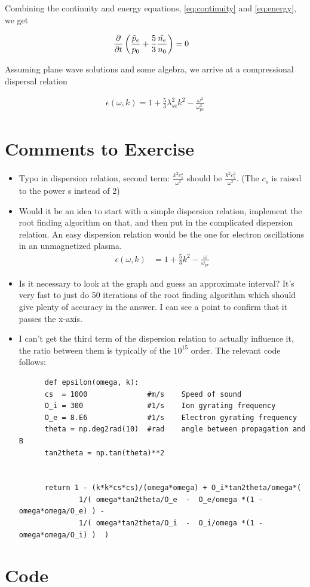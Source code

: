 \documentclass[x11names]{article}
\begin{document}
  Combining the continuity and energy equations, \cref{eq:continuity} and \cref{eq:energy}, we get

  \begin{align}
    \pdv{}{t}\left( \frac{\tilde{p}_e}{p_0} + \frac{5}{3} \frac{\tilde{n_e}}{n_0} \right) &= 0
  \end{align}

  \noindent Assuming plane wave solutions and some algebra, we arrive at a compressional dispersal relation 

  \begin{align}
    \epsilon(\omega, k) = 1 + \frac{5}{3} \lambda_{se}^2k ^2 -  \frac{\omega^2}{\omega_{pe}^2} 
  \end{align}


\section{Comments to Exercise}
  
  \begin{itemize}
    \item Typo in dispersion relation, second term: \(\frac{k^2c_s^s}{\omega^2}\) should be \(\frac{k^2c_s^2}{\omega^2}\). (The \(c_s\) is raised to the power s instead of 2)
    \item Would it be an idea to start with a simple dispersion relation, implement the root finding algorithm on that, and then put in the complicated dispersion relation. An easy dispersion relation would be the one for electron oscillations in an unmagnetized plasma.
    \begin{align}
      \epsilon(\omega, k) &= 1 + \frac{5}{3}k^2 - \frac{\omega}{\omega_{pe}}
    \end{align}
    \item Is it necessary to look at the graph and guess an approximate interval? It's very fast to just do 50 iterations of the root finding algorithm which should give plenty of accuracy in the answer. I can see a point to confirm that it passes the x-axis.
    \item I can't get the third term of the dispersion relation to actually influence it, the ratio between them is typically of the \(10^15\) order. The relevant code follows:
      \begin{lstlisting}
      def epsilon(omega, k):
      cs  = 1000              #m/s    Speed of sound
      O_i = 300               #1/s    Ion gyrating frequency
      O_e = 8.E6              #1/s    Electron gyrating frequency
      theta = np.deg2rad(10)  #rad    angle between propagation and B
      tan2theta = np.tan(theta)**2


      return 1 - (k*k*cs*cs)/(omega*omega) + O_i*tan2theta/omega*(
              1/( omega*tan2theta/O_e  -  O_e/omega *(1 - omega*omega/O_e) ) -
              1/( omega*tan2theta/O_i  -  O_i/omega *(1 - omega*omega/O_i) )  )
      \end{lstlisting}



  \end{itemize}


\section{Code}
  \label{sec:code}
  
\end{document}

